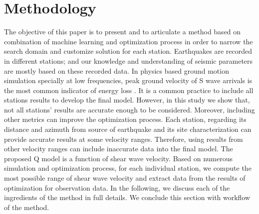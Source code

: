 
\section{Methodology}

The objective of this paper is to present and to articulate a method based on combination of machine learning and optimization process in order to narrow the search domain and customize solution for each station. Earthquakes are recorded in different stations; and our knowledge and understanding of seismic parameters are mostly based on these recorded data. In physics based ground motion simulation specially at low frequencies, peak ground velocity of S wave arrivals is the most common indicator of energy loss \citep[e.g., see][]{olsen2003estimation}. It is a common practice to include all stations results to develop the final model. However, in this study we show that, not all stations' results are accurate enough to be considered. Moreover, including other metrics can improve the optimization process. Each station, regarding its distance and azimuth from source of earthquake and its site characterization can provide accurate results at some velocity ranges. Therefore, using results from other velocity ranges can include inaccurate data into the final model. The proposed Q model is a function of shear wave velocity. Based on numerous simulation and optimization process, for each individual station, we compute the most possible range of shear wave velocity and extract data from the results of optimization for observation data. In the following, we discuss each of the ingredients of the method in full details.  We conclude this section with workflow of the method.\\




















